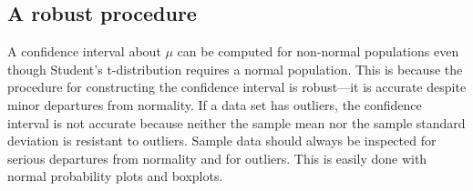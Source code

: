 \documentclass{report}
\begin{document}
    \bigbreak \noindent \bigbreak \noindent 
    \subsection*{A robust procedure}
    \bigbreak \noindent 
    A confidence interval about $\mu $ can be computed for non-normal populations even though Student’s t-distribution requires a normal population. This is because the procedure for constructing the confidence interval is robust—it is accurate despite minor departures from normality.
    \bigbreak \noindent 
    If a data set has outliers, the confidence interval is not accurate because neither the sample mean nor the sample standard deviation is resistant to outliers. Sample data should always be inspected for serious departures from normality and for outliers. This is easily done with normal probability plots and boxplots.
\end{document}
